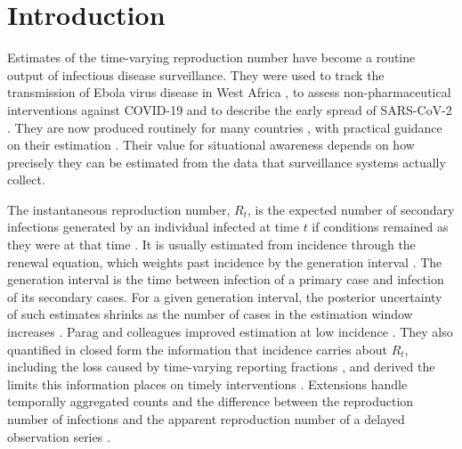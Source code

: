 \section{Introduction}
\label{sec:intro}

Estimates of the time-varying reproduction number have become a routine output of infectious disease surveillance. They were used to track the transmission of Ebola virus disease in West Africa \citep{nouvellet2018simple}, to assess non-pharmaceutical interventions against COVID-19 \citep{flaxman2020estimating} and to describe the early spread of SARS-CoV-2 \citep{kucharski2020early}. They are now produced routinely for many countries \citep{huisman2022estimation}, with practical guidance on their estimation \citep{gostic2020practical, steyn2025primer}. Their value for situational awareness depends on how precisely they can be estimated from the data that surveillance systems actually collect.

The instantaneous reproduction number, $R_t$, is the expected number of secondary infections generated by an individual infected at time $t$ if conditions remained as they were at that time \citep{fraser2007estimating}. It is usually estimated from incidence through the renewal equation, which weights past incidence by the generation interval \citep{wallinga2004different, cori2013new, thompson2019improved}. The generation interval is the time between infection of a primary case and infection of its secondary cases. For a given generation interval, the posterior uncertainty of such estimates shrinks as the number of cases in the estimation window increases \citep{cori2013new}. Parag and colleagues improved estimation at low incidence \citep{parag2021improved}. They also quantified in closed form the information that incidence carries about $R_t$, including the loss caused by time-varying reporting fractions \citep{parag2022quantifying}, and derived the limits this information places on timely interventions \citep{parag2025asymmetric}. Extensions handle temporally aggregated counts \citep{nash2023estimating, ogigittins2024simulation} and the difference between the reproduction number of infections and the apparent reproduction number of a delayed observation series \citep{eales2024differences}.

